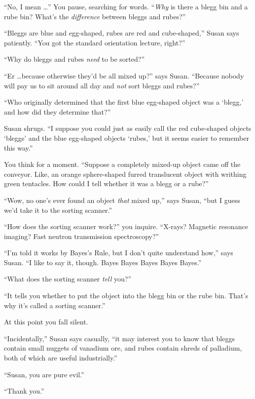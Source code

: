 {
 ``No, I mean \ldots'' You pause,
searching for words. ``\textit{Why} is there a blegg
bin and a rube bin? What's the \textit{difference}
between bleggs and rubes?''}

{
 ``Bleggs are blue and egg-shaped, rubes are red
and cube-shaped,'' Susan says patiently.
``You got the standard orientation lecture,
right?''}

{
 ``Why do bleggs and rubes \textit{need} to be
sorted?''}

{
 ``Er \ldots because otherwise
they'd be all mixed up?'' says Susan.
``Because nobody will pay us to sit around all day and
\textit{not} sort bleggs and rubes?''}

{
 ``Who originally determined that the first blue
egg-shaped object was a `blegg,' and how
did they determine that?''}

{
 Susan shrugs. ``I suppose you could just as
easily call the red cube-shaped objects
`bleggs' and the blue egg-shaped objects
`rubes,' but it seems easier to remember
this way.''}

{
 You think for a moment. ``Suppose a completely
mixed-up object came off the conveyor. Like, an orange sphere-shaped
furred translucent object with writhing green tentacles. How could I
tell whether it was a blegg or a rube?''}

{
 ``Wow, no one's ever found an
object \textit{that} mixed up,'' says Susan,
``but I guess we'd take it to the
sorting scanner.''}

{
 ``How does the sorting scanner
work?'' you inquire. ``X-rays?
Magnetic resonance imaging? Fast neutron transmission
spectroscopy?''}

{
 ``I'm told it works by
Bayes's Rule, but I don't quite
understand how,'' says Susan. ``I
like to say it, though. Bayes Bayes Bayes Bayes
Bayes.''}

{
 ``What does the sorting scanner \textit{tell}
you?''}

{
 ``It tells you whether to put the object into the
blegg bin or the rube bin. That's why
it's called a sorting scanner.''}

{
 At this point you fall silent.}

{
 ``Incidentally,'' Susan says
casually, ``it may interest you to know that bleggs
contain small nuggets of vanadium ore, and rubes contain shreds of
palladium, both of which are useful industrially.''}

{
 ``Susan, you are pure evil.''}

{
 ``Thank you.''}

